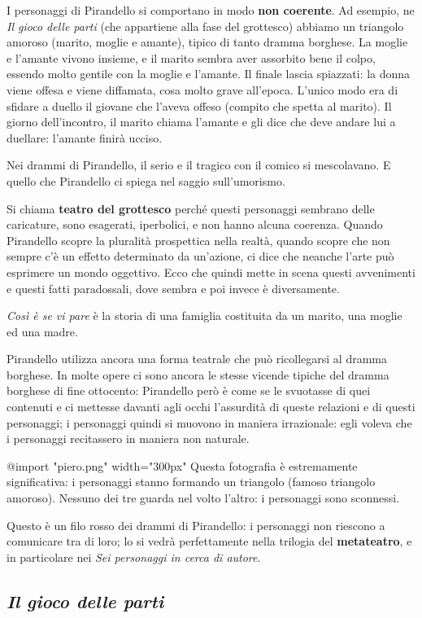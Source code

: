 I personaggi di Pirandello si comportano in modo \textbf{non coerente}. Ad esempio, ne \textit{Il gioco delle parti} (che appartiene alla fase del grottesco) abbiamo un triangolo amoroso (marito, moglie e amante), tipico di tanto dramma borghese.
La moglie e l’amante vivono insieme, e il marito sembra aver assorbito bene il colpo, essendo molto gentile con la moglie e l’amante.
Il finale lascia spiazzati: la donna viene offesa e viene diffamata, cosa molto grave all’epoca. L’unico modo era di sfidare a duello il giovane che l’aveva offeso (compito che spetta al marito).
Il giorno dell’incontro, il marito chiama l’amante e gli dice che deve andare lui a duellare: l’amante finirà ucciso.

Nei drammi di Pirandello, il serio e il tragico con il comico si mescolavano. E quello che Pirandello ci spiega nel saggio sull’umorismo.

Si chiama \textbf{teatro del grottesco} perché questi personaggi sembrano delle caricature, sono esagerati, iperbolici, e non hanno alcuna coerenza.
Quando Pirandello scopre la pluralità prospettica nella realtà, quando scopre che non sempre c’è un effetto determinato da un’azione, ci dice che neanche l’arte può esprimere un mondo oggettivo.
Ecco che quindi mette in scena questi avvenimenti e questi fatti paradossali, dove sembra e poi invece è diversamente.

\textit{Così è se vi pare} è la storia di una famiglia costituita da un marito, una moglie ed una madre.

Pirandello utilizza ancora una forma teatrale che può ricollegarsi al dramma borghese. 
In molte opere ci sono ancora le stesse vicende tipiche del dramma borghese di fine ottocento: Pirandello però è come se le svuotasse di quei contenuti e ci mettesse davanti agli occhi l’assurdità di queste relazioni e di questi personaggi; i personaggi quindi si muovono in maniera irrazionale: egli voleva che i personaggi recitassero in maniera non naturale.

@import "piero.png" {width="300px"}
Questa fotografia è estremamente significativa: i personaggi stanno formando un triangolo (famoso triangolo amoroso). Nessuno dei tre guarda nel volto l’altro: i personaggi sono sconnessi.

Questo è un filo rosso dei drammi di Pirandello: i personaggi non riescono a comunicare tra di loro; lo si vedrà perfettamente nella trilogia del \textbf{metateatro}, e in particolare nei \textit{Sei personaggi in cerca di autore}.

\subsection{\textit{Il gioco delle parti}}

